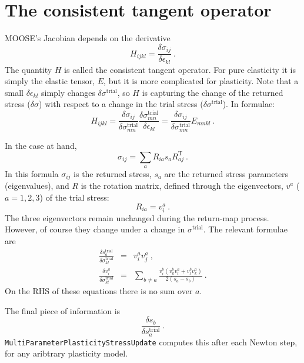 \documentclass[]{scrreprt}
\begin{document}
\section{The consistent tangent operator}
MOOSE's Jacobian depends on the derivative
\begin{equation}
H_{ijkl} = \frac{\delta\sigma_{ij}}{\delta \epsilon_{kl}} \ .
\end{equation}
The quantity $H$ is called the consistent tangent operator.  For pure
elasticity it is simply the elastic tensor, $E$, but it is more
complicated for plasticity.  Note that a small $\delta\epsilon_{kl}$
simply changes $\delta\sigma^{\mathrm{trial}}$, so $H$ is capturing the
change of the returned stress ($\delta\sigma$) with respect to a
change in the trial stress ($\delta\sigma^{\mathrm{trial}}$).  In formulae:
\begin{equation}
  H_{ijkl} = \frac{\delta\sigma_{ij}}{\delta
    \sigma_{mn}^{\mathrm{trial}}}
  \frac{\delta\sigma_{mn}^{\mathrm{trial}}}{\delta\epsilon_{kl}} =\frac{\delta\sigma_{ij}}{\delta
    \sigma_{mn}^{\mathrm{trial}}} E_{mnkl} \ .
\end{equation}

In the case at hand,
\begin{equation}
  \sigma_{ij} = \sum_{a}R_{ia}s_{a}R_{aj}^{\mathrm{T}} \ .
\end{equation}
In this formula $\sigma_{ij}$ is the returned stress, $s_{a}$ are the
returned stress parameters (eigenvalues), and $R$ is the rotation
matrix, defined through the eigenvectors, $v^{a}$ ($a=1,2,3$) of the
trial stress:
\begin{equation}
  R_{ia} = v^{a}_{i} \ .
\end{equation}
The three eigenvectors remain unchanged during the return-map
process.  However, of course they change under a change in
$\sigma^{\mathrm{trial}}$.  The relevant formulae are
\begin{eqnarray}
  \frac{\delta s_{a}^{\mathrm{trial}}}{\delta
    \sigma_{kl}^{\mathrm{trial}}} & = & v^{a}_{i}v^{a}_{j} \ , \\
  \frac{\delta v^{a}_{i}}{\delta \sigma_{kl}^{\mathrm{trial}}} & = &
  \sum_{b\neq a}\frac{v_{i}^{b}(v_{k}^{b}v_{l}^{a} +
    v_{l}^{b}v_{k}^{a})}{2(s_{a}-s_{b})} \ .
\end{eqnarray}
On the RHS of these equations there is no sum over $a$.

The final piece of information is
\begin{equation}
  \frac{\delta s_{b}}{\delta s_{a}^{\mathrm{trial}}} \ .
\end{equation}
{\tt MultiParameterPlasticityStressUpdate} computes this after each
Newton step, for any aribtrary plasticity model.
\end{document}
